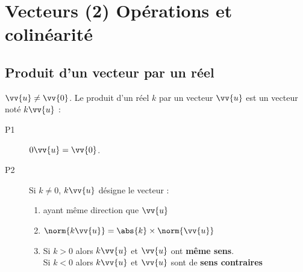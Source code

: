 \documentclass[main.tex]{subfiles}
\begin{document}
 
\cleardoublepage
{}  
\pagestyle{scrheadings} %
\onehalfspacing 
\setcounter{chapter}{12}



\chapter{Vecteurs (2) Opérations et colinéarité}
 
\section{Produit d'un vecteur par un réel}

\begin{definition} $\vv{u}\neq \vv{0}$. 
Le produit d'un réel $k$ par un vecteur $\vv{u}$ est un vecteur noté $k\vv{u}$ : 
\begin{description}
\item[P1]  $0\vv{u}=\vv{0}$.
\item[P2]  Si $k \neq  0$,  \og $k\vv{u}$ \fg{} désigne le vecteur :
\begin{enumerate}[label=\textbullet, leftmargin=*]
\item ayant même direction que $\vv{u}$ 
\item $\norm{k\vv{u}}=\abs{k}\times \norm{\vv{u}}$
\item Si $k>0$ alors $k\vv{u}$ et $\vv{u}$ ont \textbf{même sens}.\\
Si $k<0$ alors $k\vv{u}$ et $\vv{u}$ sont de \textbf{sens contraires}
\end{enumerate}
\end{description} 
\end{definition}


\vfill
\end{document}
